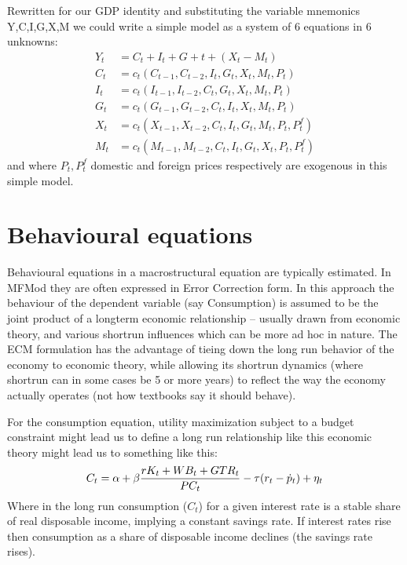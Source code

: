 \documentclass[letterpaper,10pt,english]{jupyterBook}
\begin{document}
\sphinxAtStartPar
Rewritten for our GDP identity and substituting the variable mnemonics Y,C,I,G,X,M we could write a simple model as a system of 6 equations in 6 unknowns:
\begin{align*}
Y_t  &=  C_t+I_t+G+t+ (X_t-M_t) \\
C_t &= c_t(C_{t-1},C_{t-2},I_t,G_t,X_t,M_t,P_t)\\
I_t &= c_t(I_{t-1},I_{t-2},C_t,G_t,X_t,M_t,P_t)\\
G_t &= c_t(G_{t-1},G_{t-2},C_t,I_t,X_t,M_t,P_t)\\
X_t &= c_t(X_{t-1},X_{t-2},C_t,I_t,G_t,M_t,P_t,P^f_t)\\
M_t &= c_t(M_{t-1},M_{t-2},C_t,I_t,G_t,X_t,P_t,P^f_t)
\end{align*}
\sphinxAtStartPar
and where \(P_t, P^f_t\) domestic and foreign prices respectively are exogenous in this simple model.


\section{Behavioural equations}
\label{\detokenize{content/02_MacrostructuralModels/MacroStructuralModels:behavioural-equations}}
\sphinxAtStartPar
Behavioural equations in a macrostructural equation are typically estimated. In MFMod they are often expressed in Error Correction form. In this approach the behaviour of the dependent variable (say Consumption) is assumed to be the joint product of a long\sphinxhyphen{}term economic relationship – usually drawn from economic theory, and various short\sphinxhyphen{}run influences which can be more ad hoc in nature. The ECM formulation has the advantage of tieing down the long run behavior of the economy to economic theory, while allowing its short\sphinxhyphen{}run dynamics (where short\sphinxhyphen{}run can in some cases be 5 or more years) to reflect the way the economy actually operates (not how textbooks say it should behave).

\sphinxAtStartPar
For the consumption equation, utility maximization subject to a budget constraint might lead us to define a long run relationship like this economic theory might lead us to something like this:
\begin{equation*}
\begin{split} C_t = \alpha + \beta{{rK_t + WB_{t} + GTR_{t}}\over {PC_t}}-\tau(r_t-\dot{p}_t) +\eta_t\end{split}
\end{equation*}
\sphinxAtStartPar
Where in the long run consumption (\(C_t\)) for a given interest rate is a stable share of real disposable income, implying a constant savings rate.  If interest rates rise then consumption as a share of disposable income declines (the savings rate rises).
\end{document}
